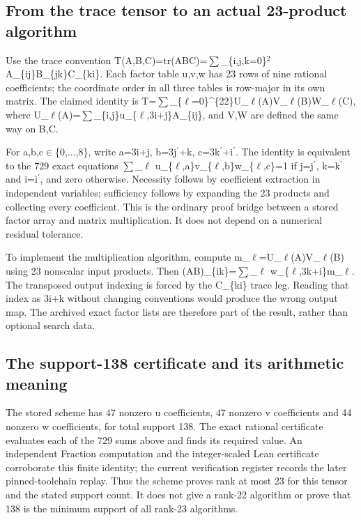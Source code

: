 \documentclass[11pt,a4paper]{article}
\begin{document}
\subsection{From the trace tensor to an actual 23-product algorithm}
Use the trace convention T(A,B,C)=tr(ABC)=\ensuremath{\sum}\_\{i,j,k=0\}\ensuremath{^2} A\_\{ij\}B\_\{jk\}C\_\{ki\}. Each factor table u,v,w has 23 rows of nine rational coefficients; the coordinate order in all three tables is row-major in its own matrix. The claimed identity is T=\ensuremath{\sum}\_\{\ensuremath{\ell}=0\}\textasciicircum{}\{22\}U\_\ensuremath{\ell}(A)V\_\ensuremath{\ell}(B)W\_\ensuremath{\ell}(C), where U\_\ensuremath{\ell}(A)=\ensuremath{\sum}\_\{i,j\}u\_\{\ensuremath{\ell},3i+j\}A\_\{ij\}, and V,W are defined the same way on B,C.

For a,b,c\ensuremath{\in}\{0,...,8\}, write a=3i+j, b=3j\ensuremath{^{\prime}}+k, c=3k\ensuremath{^{\prime}}+i\ensuremath{^{\prime}}. The identity is equivalent to the 729 exact equations \ensuremath{\sum}\_\ensuremath{\ell} u\_\{\ensuremath{\ell},a\}v\_\{\ensuremath{\ell},b\}w\_\{\ensuremath{\ell},c\}=1 if j=j\ensuremath{^{\prime}}, k=k\ensuremath{^{\prime}} and i=i\ensuremath{^{\prime}}, and zero otherwise. Necessity follows by coefficient extraction in independent variables; sufficiency follows by expanding the 23 products and collecting every coefficient. This is the ordinary proof bridge between a stored factor array and matrix multiplication. It does not depend on a numerical residual tolerance.

To implement the multiplication algorithm, compute m\_\ensuremath{\ell}=U\_\ensuremath{\ell}(A)V\_\ensuremath{\ell}(B) using 23 nonscalar input products. Then (AB)\_\{ik\}=\ensuremath{\sum}\_\ensuremath{\ell} w\_\{\ensuremath{\ell},3k+i\}m\_\ensuremath{\ell}. The transposed output indexing is forced by the C\_\{ki\} trace leg. Reading that index as 3i+k without changing conventions would produce the wrong output map. The archived exact factor lists are therefore part of the result, rather than optional search data.

\subsection{The support-138 certificate and its arithmetic meaning}
The stored scheme has 47 nonzero u coefficients, 47 nonzero v coefficients and 44 nonzero w coefficients, for total support 138. The exact rational certificate evaluates each of the 729 sums above and finds its required value. An independent Fraction computation and the integer-scaled Lean certificate corroborate this finite identity; the current verification register records the later pinned-toolchain replay. Thus the scheme proves rank at most 23 for this tensor and the stated support count. It does not give a rank-22 algorithm or prove that 138 is the minimum support of all rank-23 algorithms.
\end{document}
